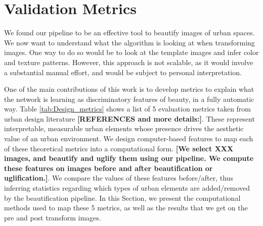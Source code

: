 \section{Validation Metrics}
We found our pipeline to be an effective tool to beautify images of urban spaces. We now want to understand what the algorithm is looking at when transforming images. One way to do so would be to look at the template images and infer color and texture patterns. However, this approach is not scalable, as it would involve a substantial manual effort, and would be subject to personal interpretation. 
 
%
One of the main contributions of this work is to develop metrics%
to explain what the network is learning %
as discriminatory features of beauty, in a fully automatic way. %
Table \ref{tab:Design_metrics} shows a list of 5 evaluation metrics%
taken from urban design literature \textbf{[REFERENCES and more details:]}. These represent interpretable, measurable urban elements whose presence drives the aesthetic value of an urban environment. %
We design computer-based features to map each of these theoretical metrics into a computational form. 
 \textbf{[We select XXX images, and beautify and uglify them using our pipeline. We compute these features on images before and after beautification or uglification.]}.
We compare the values of these features before/after, thus inferring statistics regarding which types of urban elements are added/removed by the beautification pipeline.
In this Section, we present the computational methods used to map these 5 metrics, as well as the results that we get on the pre and post transform images. 


